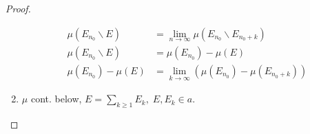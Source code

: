 \begin{proof}
\begin{enumerate}
		\begin{equation}
		\begin{split}
		\mu \left( {{E_{{n_0}}}\backslash E} \right) & = \mathop {\lim }\limits_{n \to \infty } \mu \left( {{E_{{n_0}}}\backslash {E_{{n_0} + k}}} \right)\\
		\mu \left( {{E_{{n_0}}}\backslash E} \right) & = \mu \left( {{E_{{n_0}}}} \right) - \mu \left( E \right)\\
		\mu \left( {{E_{{n_0}}}} \right) - \mu \left( E \right) & = \mathop {\lim }\limits_{k \to \infty } \left( {\mu \left( {{E_{{n_0}}}} \right) - \mu \left( {{E_{{n_0} + k}}} \right)} \right)
		\end{split}
		\end{equation}
		\label{eq3.8}
		\item $ \mu $ cont. below, $E = \sum\limits_{k \geqslant 1} {{E_k}} ,\;E,{E_k} \in a$.
		

\end{enumerate}
\end{proof}
